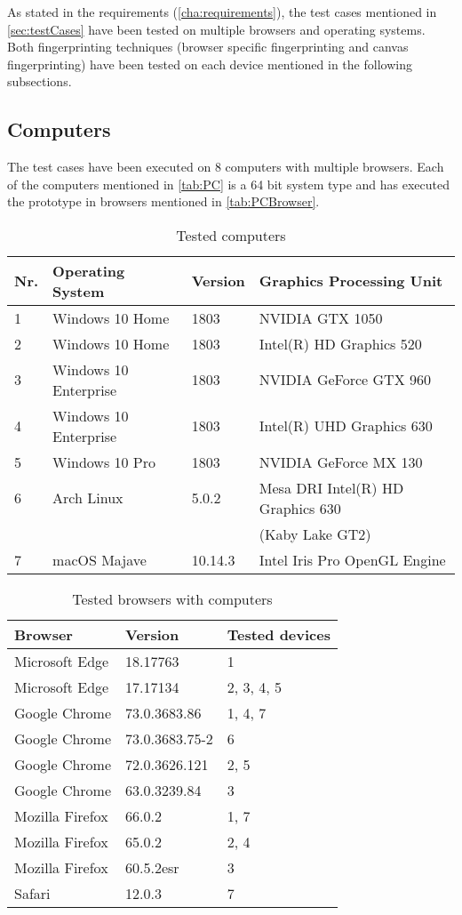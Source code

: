 As stated in the requirements (\autoref{cha:requirements}), the test cases mentioned in \autoref{sec:testCases} have been tested on multiple browsers and operating systems. Both fingerprinting techniques (browser specific fingerprinting and canvas fingerprinting) have been tested on each device mentioned in the following subsections.

\subsection{Computers}
The test cases have been executed on 8 computers with multiple browsers. Each of the computers mentioned in \autoref{tab:PC} is a 64 bit system type and has executed the prototype in browsers mentioned in \autoref{tab:PCBrowser}.

\begin{table}[h]
	\centering
	\begin{tabular}{llll}
		Nr. & Operating System & Version & Graphics Processing Unit \\ \hline
		\rule{0pt}{15pt}1 & Windows 10 Home & 1803 & NVIDIA GTX 1050 \\
		2 & Windows 10 Home & 1803 & Intel(R) HD Graphics 520 \\
		3 & Windows 10 Enterprise & 1803 & NVIDIA GeForce GTX 960 \\
		4 & Windows 10 Enterprise & 1803 & Intel(R) UHD Graphics 630 \\
		5 & Windows 10 Pro & 1803 & NVIDIA GeForce MX 130 \\
		6 & Arch Linux & 5.0.2 & Mesa DRI Intel(R) HD Graphics 630 \\&&& (Kaby Lake GT2) \\
		7 & macOS Majave & 10.14.3 & Intel Iris Pro OpenGL Engine
	\end{tabular}
\caption{Tested computers}
\label{tab:PC}
\end{table}


\begin{table}[h]
	\centering
	\begin{tabular}{lll}
		Browser & Version & Tested devices \\ \hline
		\rule{0pt}{15pt}Microsoft Edge & 18.17763 & 1 \\
		Microsoft Edge & 17.17134 & 2, 3, 4, 5 \\
		Google Chrome & 73.0.3683.86 & 1, 4, 7 \\
		Google Chrome & 73.0.3683.75-2 & 6 \\
		Google Chrome & 72.0.3626.121 & 2, 5 \\
		Google Chrome & 63.0.3239.84 & 3 \\
		Mozilla Firefox & 66.0.2 & 1, 7 \\
		Mozilla Firefox & 65.0.2 & 2, 4 \\
		Mozilla Firefox & 60.5.2esr & 3 \\
		Safari & 12.0.3 & 7
	\end{tabular}
	\caption{Tested browsers with computers}
	\label{tab:PCBrowser}
\end{table}


